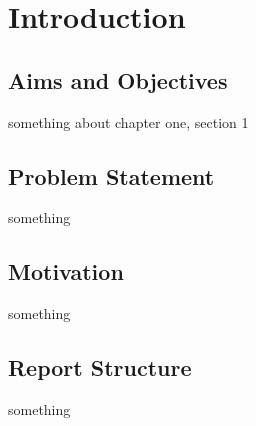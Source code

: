 \chapter{Introduction}

\section{Aims and Objectives}

something about chapter one, section 1

\section{Problem Statement}

something

\section{Motivation}

something

\section{Report Structure}

something
